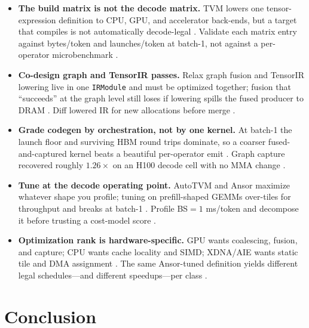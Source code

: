 \begin{itemize}
\item \textbf{The build matrix is not the decode matrix.}
TVM lowers one tensor-expression definition to CPU, GPU, and accelerator back-ends, but a target that compiles is not automatically decode-legal \citep{chen2018tvm}. Validate each matrix entry against bytes/token and launches/token at batch-1, not against a per-operator microbenchmark \citep{taxbreak2026,memoryfloor2026}.

\item \textbf{Co-design graph and TensorIR passes.}
Relax graph fusion and TensorIR lowering live in one \texttt{IRModule} and must be optimized together; fusion that ``succeeds'' at the graph level still loses if lowering spills the fused producer to DRAM \citep{lai2023relax,yirage2026}. Diff lowered IR for new allocations before merge \citep{chen2018tvm}.

\item \textbf{Grade codegen by orchestration, not by one kernel.}
At batch-1 the launch floor and surviving HBM round trips dominate, so a coarser fused-and-captured kernel beats a beautiful per-operator emit \citep{taxbreak2026,nvidia2024cudagraphs}. Graph capture recovered roughly $1.26\times$ on an H100 decode cell with no MMA change \citep{memoryfloor2026}.

\item \textbf{Tune at the decode operating point.}
AutoTVM and Ansor maximize whatever shape you profile; tuning on prefill-shaped GEMMs over-tiles for throughput and breaks at batch-1 \citep{chen2018autotvm,zheng2020ansor}. Profile BS${=}1$ ms/token and decompose it before trusting a cost-model score \citep{patel2025llminference}.

\item \textbf{Optimization rank is hardware-specific.}
GPU wants coalescing, fusion, and capture; CPU wants cache locality and SIMD; XDNA/AIE wants static tile and DMA assignment \citep{amd2024xdna,amd2024aie}. The same Ansor-tuned definition yields different legal schedules---and different speedups---per class \citep{zheng2020ansor}.
\end{itemize}

\section{Conclusion}
\label{sec:ch16_conclusion}

